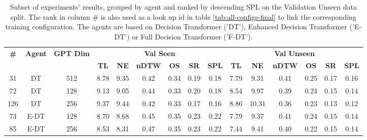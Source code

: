 \begin{table}
\centering
\caption{\label{tab:dim_test}Subset of experiments' results, grouped by agent and ranked by descending SPL on the Validation Unseen data split. The rank in column \# is also used as a look up id in table \ref{tab:all-configs-final} to link the corresponding training configuration.     \newline The agents are based on Decision Transformer ('DT'), Enhanced Decision Transformer ('E-DT') or Full Decision Transformer ('F-DT').}
\begin{tabular}{@{\hskip3pt}c@{\hskip3pt}c@{\hskip3pt}c@{\hskip3pt}c@{\hskip3pt}c@{\hskip3pt}c@{\hskip3pt}c@{\hskip3pt}c@{\hskip3pt}c@{\hskip3pt}c@{\hskip3pt}c@{\hskip3pt}c@{\hskip3pt}c@{\hskip3pt}c@{\hskip3pt}c}
\toprule
\textbf{\#} & \textbf{Agent} & \textbf{GPT Dim} & \multicolumn{6}{c}{\textbf{Val Seen}} & \multicolumn{6}{c}{\textbf{Val Unseen}} \\
 \textbf{~} &     \textbf{~} &       \textbf{~} &       \textbf{TL} & \textbf{NE} & \textbf{nDTW} & \textbf{OS} & \textbf{SR} & \textbf{SPL} &         \textbf{TL} & \textbf{NE} & \textbf{nDTW} & \textbf{OS} & \textbf{SR} & \textbf{SPL} \\
\midrule
         31 &             DT &              512 &              8.78 &        9.35 &          0.42 &        0.34 &        0.19 &         0.18 &                7.79 &        9.31 &          0.41 &        0.25 &        0.17 &         0.16 \\
         72 &             DT &              128 &              9.13 &        9.05 &          0.44 &        0.33 &        0.20 &         0.18 &                8.54 &        9.97 &          0.39 &        0.24 &        0.15 &         0.14 \\
        126 &             DT &              256 &              9.37 &        9.44 &          0.42 &        0.33 &        0.17 &         0.16 &                8.86 &       10.31 &          0.36 &        0.23 &        0.13 &         0.12 \\
         73 &           E-DT &              128 &              8.70 &        8.68 &          0.45 &        0.35 &        0.23 &         0.22 &                7.79 &        9.37 &          0.41 &        0.24 &        0.15 &         0.14 \\
         85 &           E-DT &              256 &              8.53 &        8.31 &          0.47 &        0.35 &        0.23 &         0.22 &                7.44 &        9.41 &          0.40 &        0.22 &        0.15 &         0.14 \\

\end{tabular}
\end{table}
